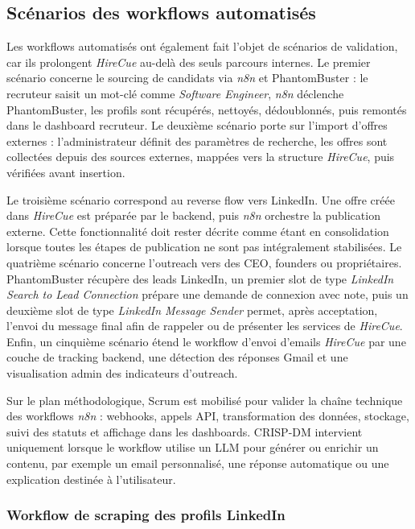 \subsection{Scénarios des workflows automatisés}

Les workflows automatisés ont également fait l'objet de scénarios de validation, car ils prolongent \textit{HireCue} au-delà des seuls parcours internes. Le premier scénario concerne le sourcing de candidats via \textit{n8n} et PhantomBuster : le recruteur saisit un mot-clé comme \textit{Software Engineer}, \textit{n8n} déclenche PhantomBuster, les profils sont récupérés, nettoyés, dédoublonnés, puis remontés dans le dashboard recruteur. Le deuxième scénario porte sur l'import d'offres externes : l'administrateur définit des paramètres de recherche, les offres sont collectées depuis des sources externes, mappées vers la structure \textit{HireCue}, puis vérifiées avant insertion.

Le troisième scénario correspond au reverse flow vers LinkedIn. Une offre créée dans \textit{HireCue} est préparée par le backend, puis \textit{n8n} orchestre la publication externe. Cette fonctionnalité doit rester décrite comme étant en consolidation lorsque toutes les étapes de publication ne sont pas intégralement stabilisées. Le quatrième scénario concerne l'outreach vers des CEO, founders ou propriétaires. PhantomBuster récupère des leads LinkedIn, un premier slot de type \textit{LinkedIn Search to Lead Connection} prépare une demande de connexion avec note, puis un deuxième slot de type \textit{LinkedIn Message Sender} permet, après acceptation, l'envoi du message final afin de rappeler ou de présenter les services de \textit{HireCue}. Enfin, un cinquième scénario étend le workflow d'envoi d'emails \textit{HireCue} par une couche de tracking backend, une détection des réponses Gmail et une visualisation admin des indicateurs d'outreach.

Sur le plan méthodologique, Scrum est mobilisé pour valider la chaîne technique des workflows \textit{n8n} : webhooks, appels API, transformation des données, stockage, suivi des statuts et affichage dans les dashboards. CRISP-DM intervient uniquement lorsque le workflow utilise un LLM pour générer ou enrichir un contenu, par exemple un email personnalisé, une réponse automatique ou une explication destinée à l'utilisateur.

\subsubsection{Workflow de scraping des profils LinkedIn}

